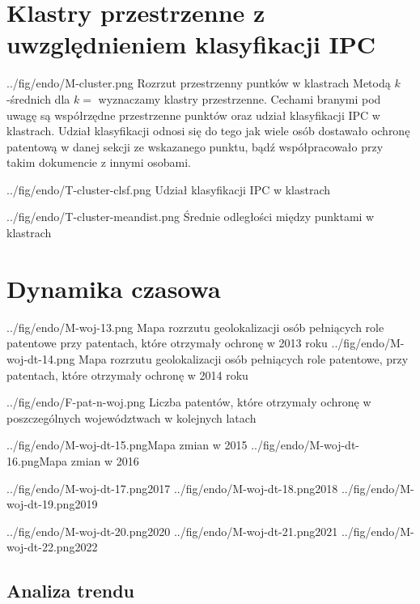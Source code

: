     \newpage\section
  {Klastry przestrzenne z uwzględnieniem klasyfikacji \ac{IPC}}

\figside
  {../fig/endo/M-cluster.png}
    {Rozrzut przestrzenny puntków w klastrach}
{
  Metodą $k$-średnich dla $k=$ wyznaczamy klastry przestrzenne. 
  Cechami branymi pod uwagę są współrzędne przestrzenne punktów oraz
  udział klasyfikacji \ac{IPC} w klastrach. Udział klasyfikacji
  odnosi się do tego jak wiele osób dostawało ochronę patentową
  w danej sekcji ze wskazanego punktu, bądź współpracowało przy
  takim dokumencie z innymi osobami.
}

\tblside
  {../fig/endo/T-cluster-clsf.png}
    {Udział klasyfikacji \ac{IPC} w klastrach}

\tblside
  {../fig/endo/T-cluster-meandist.png}
    {Średnie odległości między punktami w klastrach}




    \newpage\section{Dynamika czasowa}

  \figsides
{../fig/endo/M-woj-13.png}
{ Mapa rozrzutu geolokalizacji osób pełniących role patentowe 
  przy patentach, które otrzymały ochronę w 2013 roku}
{../fig/endo/M-woj-dt-14.png}
{ Mapa rozrzutu geolokalizacji osób pełniących role patentowe, 
  przy patentach, które otrzymały ochronę w 2014 roku}

  \figside
{../fig/endo/F-pat-n-woj.png}
{ Liczba patentów, które otrzymały ochronę w poszczególnych województwach 
  w kolejnych latach }

  \newpage\figsides
{../fig/endo/M-woj-dt-15.png}{Mapa zmian w 2015}
{../fig/endo/M-woj-dt-16.png}{Mapa zmian w 2016}

  \figsidesTri
{../fig/endo/M-woj-dt-17.png}{2017}
{../fig/endo/M-woj-dt-18.png}{2018}
{../fig/endo/M-woj-dt-19.png}{2019}

  \figsidesTri
{../fig/endo/M-woj-dt-20.png}{2020}
{../fig/endo/M-woj-dt-21.png}{2021}
{../fig/endo/M-woj-dt-22.png}{2022}



  \newpage\subsection
{Analiza trendu}




